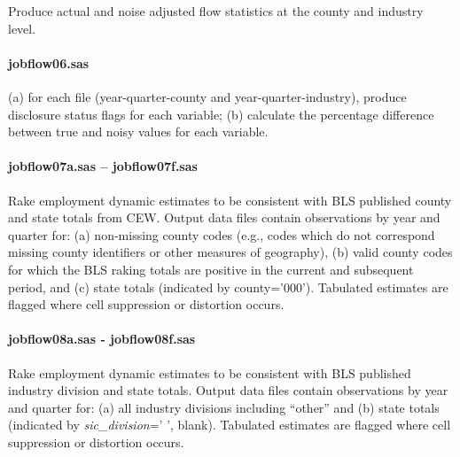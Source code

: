 Produce actual and noise adjusted flow statistics at the county and industry 
level.

\paragraph{jobflow06.sas }

(a) for each file (year-quarter-county and year-quarter-industry), produce
disclosure status flags for each variable; (b) calculate the percentage
difference between true and noisy values for each variable.

\paragraph{jobflow07a.sas -- jobflow07f.sas}

 Rake employment dynamic estimates to be consistent with
BLS published county and state totals from CEW.
Output data files contain observations by year and quarter for: (a)
non-missing county codes (e.g., codes which do not correspond missing
county identifiers or other measures of geography), (b) valid county codes
for which the BLS raking totals are positive in the current and subsequent
period, and (c) state totals (indicated by county='000').  Tabulated
estimates are flagged where cell suppression or
distortion occurs.

\paragraph{jobflow08a.sas - jobflow08f.sas}

 Rake employment dynamic estimates to be consistent with BLS
published industry division and state totals.  Output data files contain
observations by year and quarter for: (a) all industry divisions including
``other'' and (b) state totals (indicated by \textit{sic\_division}=' ',
blank).  Tabulated estimates are flagged where cell suppression or distortion occurs.

